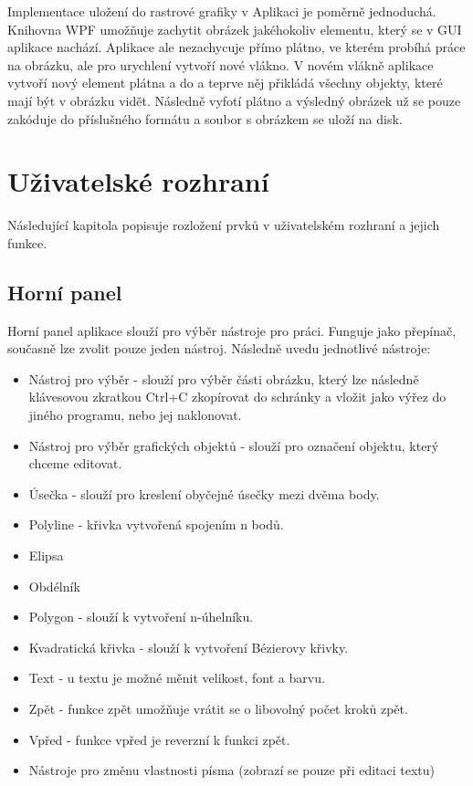 \documentclass[
  field=inf,
  biblatex,
  glossaries,
  index
]{kidiplom}
\begin{document}
Implementace uložení do rastrové grafiky v Aplikaci je poměrně jednoduchá. Knihovna WPF umožňuje zachytit obrázek jakéhokoliv elementu, který se v GUI aplikace nachází. Aplikace ale nezachycuje přímo plátno, ve kterém probíhá práce na obrázku, ale pro urychlení vytvoří nové vlákno. V novém vlákně aplikace vytvoří nový element plátna a do a teprve něj přikládá všechny objekty, které mají být v obrázku vidět. Následně vyfotí plátno a výsledný obrázek už se pouze zakóduje do příslušného formátu a soubor s obrázkem se uloží na disk.


\section{Uživatelské rozhraní}

Následující kapitola popisuje rozložení prvků v uživatelském rozhraní a jejich funkce.

\subsection{Horní panel}
Horní panel aplikace slouží pro výběr nástroje pro práci. Funguje jako přepínač, současně lze zvolit pouze jeden nástroj. Následně uvedu jednotlivé nástroje:

\begin{itemize}
\item Nástroj pro výběr - slouží pro výběr části obrázku, který lze následně klávesovou zkratkou Ctrl+C zkopírovat do schránky a vložit jako výřez do jiného programu, nebo jej naklonovat.
\item Nástroj pro výběr grafických objektů - slouží pro označení objektu, který chceme editovat.
\item Úsečka - slouží pro kreslení obyčejné úsečky mezi dvěma body.
\item Polyline - křivka vytvořená spojením n bodů.
\item Elipsa
\item Obdélník
\item Polygon - slouží k vytvoření n-úhelníku.
\item Kvadratická křivka - slouží k vytvoření Bézierovy křivky.
\item Text - u textu je možné měnit velikost, font a barvu.
\item Zpět - funkce zpět umožňuje vrátit se o libovolný počet kroků zpět.
\item Vpřed - funkce vpřed je reverzní k funkci zpět.
\item Nástroje pro změnu vlastnosti písma (zobrazí se pouze při editaci textu)
\end{itemize}
\end{document}
